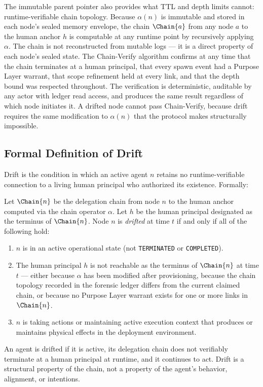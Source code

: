 The immutable parent pointer also provides what TTL and depth limits cannot: runtime-verifiable chain topology. Because $\alpha(n)$ is immutable and stored in each node's sealed memory envelope, the chain $\Chain{a}$ from any node $a$ to the human anchor $h$ is computable at any runtime point by recursively applying $\alpha$. The chain is not reconstructed from mutable logs — it is a direct property of each node's sealed state. The Chain-Verify algorithm confirms at any time that the chain terminates at a human principal, that every spawn event had a Purpose Layer warrant, that scope refinement held at every link, and that the depth bound was respected throughout. The verification is deterministic, auditable by any actor with ledger read access, and produces the same result regardless of which node initiates it. A drifted node cannot pass Chain-Verify, because drift requires the same modification to $\alpha(n)$ that the protocol makes structurally impossible.

\subsection{Formal Definition of Drift}
\label{sec:drift-definition}

Drift is the condition in which an active agent $n$ retains no runtime-verifiable connection to a living human principal who authorized its existence. Formally:

\begin{dfn}[Drift]
\label{dfn:drift}
Let $\Chain{n}$ be the delegation chain from node $n$ to the human anchor computed via the chain operator $\alpha$. Let $h$ be the human principal designated as the terminus of $\Chain{n}$. Node $n$ is \emph{drifted} at time $t$ if and only if all of the following hold:

\begin{enumerate}
    \item[(D1)] $n$ is in an active operational state (not \texttt{TERMINATED} or \texttt{COMPLETED}).
    \item[(D2)] The human principal $h$ is not reachable as the terminus of $\Chain{n}$ at time $t$ — either because $\alpha$ has been modified after provisioning, because the chain topology recorded in the forensic ledger differs from the current claimed chain, or because no Purpose Layer warrant exists for one or more links in $\Chain{n}$.
    \item[(D3)] $n$ is taking actions or maintaining active execution context that produces or maintains physical effects in the deployment environment.
\end{enumerate}

An agent is drifted if it is active, its delegation chain does not verifiably terminate at a human principal at runtime, and it continues to act. Drift is a structural property of the chain, not a property of the agent's behavior, alignment, or intentions.
\end{dfn}

